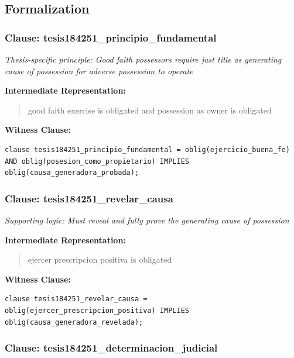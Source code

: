 \documentclass[11pt,a4paper]{article}
\begin{document}
\subsection{Formalization}

\subsubsection{Clause: tesis184251\_principio\_fundamental}

\textit{Thesis-specific principle: Good faith possessors require just title as generating cause of possession for adverse possession to operate}

\textbf{Intermediate Representation:}

\begin{quote}
good faith exercise is obligated and possession as owner is obligated
\end{quote}

\textbf{Witness Clause:}

\begin{lstlisting}[style=witnessstyle, language=Witness]
clause tesis184251_principio_fundamental = oblig(ejercicio_buena_fe) AND oblig(posesion_como_propietario) IMPLIES oblig(causa_generadora_probada);
\end{lstlisting}

\subsubsection{Clause: tesis184251\_revelar\_causa}

\textit{Supporting logic: Must reveal and fully prove the generating cause of possession}

\textbf{Intermediate Representation:}

\begin{quote}
ejercer prescripcion positiva is obligated
\end{quote}

\textbf{Witness Clause:}

\begin{lstlisting}[style=witnessstyle, language=Witness]
clause tesis184251_revelar_causa = oblig(ejercer_prescripcion_positiva) IMPLIES oblig(causa_generadora_revelada);
\end{lstlisting}

\subsubsection{Clause: tesis184251\_determinacion\_judicial}
\end{document}
